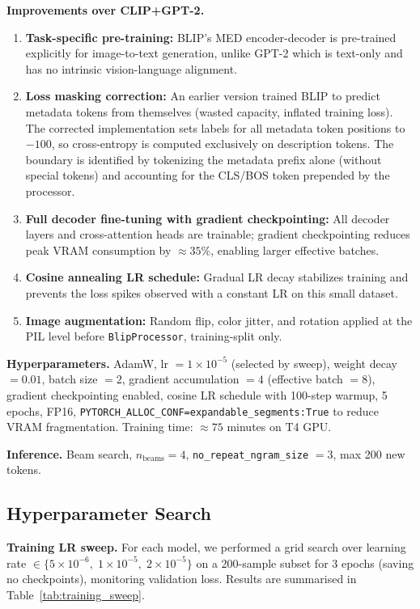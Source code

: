 \documentclass[12pt,a4paper]{article}
\begin{document}
\textbf{Improvements over CLIP+GPT-2.}
\begin{enumerate}[noitemsep]
  \item \textbf{Task-specific pre-training:} BLIP's MED encoder-decoder is pre-trained
        explicitly for image-to-text generation, unlike GPT-2 which is text-only and
        has no intrinsic vision-language alignment.
  \item \textbf{Loss masking correction:} An earlier version trained BLIP to predict
        metadata tokens from themselves (wasted capacity, inflated training loss).
        The corrected implementation sets labels for all metadata token positions to
        $-100$, so cross-entropy is computed exclusively on description tokens.
        The boundary is identified by tokenizing the metadata prefix alone (without
        special tokens) and accounting for the CLS/BOS token prepended by the processor.
  \item \textbf{Full decoder fine-tuning with gradient checkpointing:} All decoder
        layers and cross-attention heads are trainable; gradient checkpointing
        reduces peak VRAM consumption by $\approx35\%$, enabling larger effective batches.
  \item \textbf{Cosine annealing LR schedule:} Gradual LR decay stabilizes training
        and prevents the loss spikes observed with a constant LR on this small dataset.
  \item \textbf{Image augmentation:} Random flip, color jitter, and rotation applied
        at the PIL level before \texttt{BlipProcessor}, training-split only.
\end{enumerate}

\textbf{Hyperparameters.} AdamW, lr $= 1 \times 10^{-5}$ (selected by sweep),
weight decay $= 0.01$, batch size $= 2$, gradient accumulation $= 4$ (effective batch
$= 8$), gradient checkpointing enabled, cosine LR schedule with 100-step warmup,
5 epochs, FP16, \texttt{PYTORCH\_ALLOC\_CONF=expandable\_segments:True} to reduce
VRAM fragmentation. Training time: $\approx 75$ minutes on T4 GPU.

\textbf{Inference.} Beam search, $n_{\text{beams}} = 4$, \texttt{no\_repeat\_ngram\_size} $= 3$,
max 200 new tokens.

\subsection{Hyperparameter Search}

\textbf{Training LR sweep.} For each model, we performed a grid search over learning
rate $\in \{5 \times 10^{-6},\; 1 \times 10^{-5},\; 2 \times 10^{-5}\}$ on a
200-sample subset for 3 epochs (saving no checkpoints), monitoring validation loss.
Results are summarised in Table~\ref{tab:training_sweep}.
\end{document}
